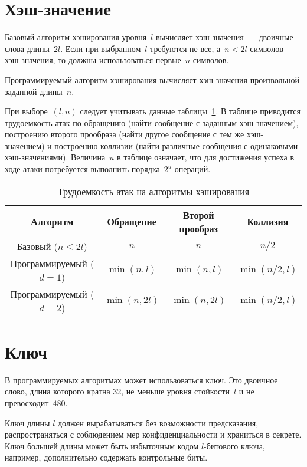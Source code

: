 \section{Хэш-значение}\label{COMMON.Hash}

Базовый алгоритм хэширования уровня~$l$ вычисляет хэш-значения~---
двоичные слова длины~$2l$. 
%
Если при выбранном~$l$ требуются не все, а~$n<2l$ символов 
хэш-значения, то должны использоваться первые~$n$ символов.

Программируемый алгоритм хэширования вычисляет хэш-значения 
произвольной заданной длины~$n$.

При выборе~$(l,n)$ следует учитывать данные таблицы~\ref{Table.COMMON.Hash}.
В таблице приводится трудоемкость атак по 
обращению (найти сообщение с заданным хэш-значением),
построению второго прообраза (найти другое сообщение с тем же хэш-значением)
и построению коллизии (найти различные сообщения с одинаковыми хэш-значениями).
%
Величина~$u$ в таблице означает, что для достижения успеха в ходе атаки 
потребуется выполнить порядка~$2^u$ операций.

\begin{table}[hbt]
\caption{Трудоемкость атак на алгоритмы хэширования}\label{Table.COMMON.Hash}
\begin{tabular}{|c|c|c|c|}
\hline
Алгоритм & Обращение & Второй прообраз & Коллизия\\
\hline
\hline
Базовый ($n\leq 2l$) & $n$ & $n$ & $n/2$\\
Программируемый ($d=1$) & $\min(n,l)$ & $\min(n,l)$ & $\min(n/2,l)$\\
Программируемый ($d=2$) & $\min(n,2l)$ & $\min(n,2l)$ & $\min(n/2,l)$\\
\hline
\end{tabular}
\end{table}

\section{Ключ}\label{COMMON.Key}

В программируемых алгоритмах может использоваться ключ.
%
Это двоичное слово, длина которого кратна 32, не меньше уровня стойкости~$l$ 
и не превосходит~$480$. 

Ключ длины $l$ должен вырабатываться без возможности предсказания, 
распространяться с соблюдением мер конфиденциальности и храниться в секрете.
%
Ключ большей длины может быть избыточным кодом $l$-битового 
ключа, например, дополнительно содержать контрольные биты.

